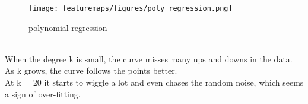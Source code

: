 \begin{answer}
\begin{figure}[htbp]
  \centering
  \texttt{[image: featuremaps/figures/poly\_regression.png]}
  \caption{polynomial regression }
  \label{fig:polynomial regression}
\end{figure}
\\When the degree k is small, the curve misses many ups and downs in the data.\\
 As k grows, the curve follows the points better.\\
 At k = 20 it starts to wiggle a lot and even chases the random noise, which seems a sign of over-fitting.
\end{answer}
